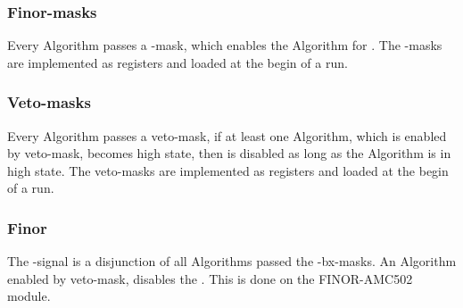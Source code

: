 \subsubsection{Finor-masks}
\label{sec:fdl:finor_masks}

Every Algorithm passes a \finor-mask, which enables the Algorithm for \finor.
The \finor-masks are implemented as registers and loaded at the begin of a run.

\subsubsection{Veto-masks}
\label{sec:fdl:veto_masks}

Every Algorithm passes a veto-mask, if at least one Algorithm, which is enabled by veto-mask, becomes high state, then \finor is disabled as long as the Algorithm is in high state.
The veto-masks are implemented as registers and loaded at the begin of a run.

\subsubsection{Finor}
\label{sec:fdl:finor}

The \finor-signal is a disjunction of all Algorithms passed the \finor-bx-masks. An Algorithm enabled by veto-mask, disables the \finor. This is done on the FINOR-AMC502 module.

\clearpage
